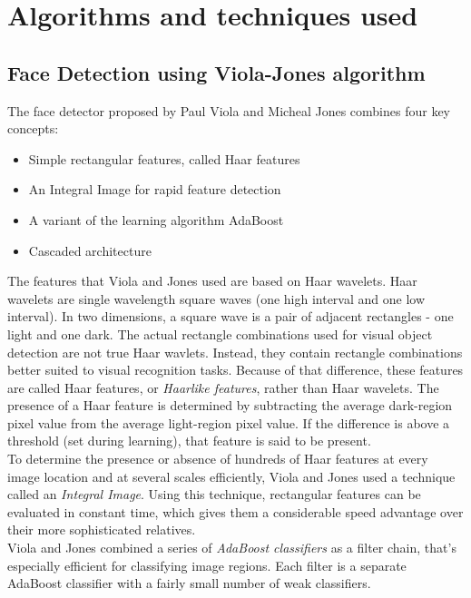 \documentclass[%
        final,
        internal,
        notitlepage,
        narroweqnarray,
        inline,
        ]{ieee}
\begin{document}
\section{Algorithms and techniques used} \label{sec:algo}

\subsection{Face Detection using Viola-Jones algorithm}
The face detector proposed by Paul Viola and Micheal Jones\cite{Viola01} combines four key concepts\cite{servo}:
\begin{itemize}
	\item Simple rectangular features, called Haar features
	\item An Integral Image for rapid feature detection
	\item A variant of the learning algorithm AdaBoost
	\item Cascaded architecture
\end{itemize}
The features that Viola and Jones used are based on Haar wavelets.
Haar wavelets are single wavelength square waves (one high interval and one low interval).
In two dimensions, a square wave is a pair of adjacent rectangles - one light and one dark.
The actual rectangle combinations used for visual object detection are not true Haar wavlets.
Instead, they contain rectangle combinations better suited to visual recognition tasks.
Because of that difference, these features are called Haar features, or \emph{Haarlike features}, rather than Haar wavelets.
The presence of a Haar feature is determined by subtracting the average dark-region pixel value from the average light-region pixel value.
If the difference is above a threshold (set during learning), that feature is said to be present.\\
To determine the presence or absence of hundreds of Haar features at every image location and at several scales efficiently, Viola and Jones used a technique called an \emph{Integral Image}.
Using this technique, rectangular features can be evaluated in constant time, which gives them a considerable speed advantage over their more sophisticated relatives.\\
Viola and Jones combined a series of \emph{AdaBoost classifiers} as a filter chain, that's especially efficient for classifying image regions.
Each filter is a separate AdaBoost classifier with a fairly small number of weak classifiers.
\end{document}
